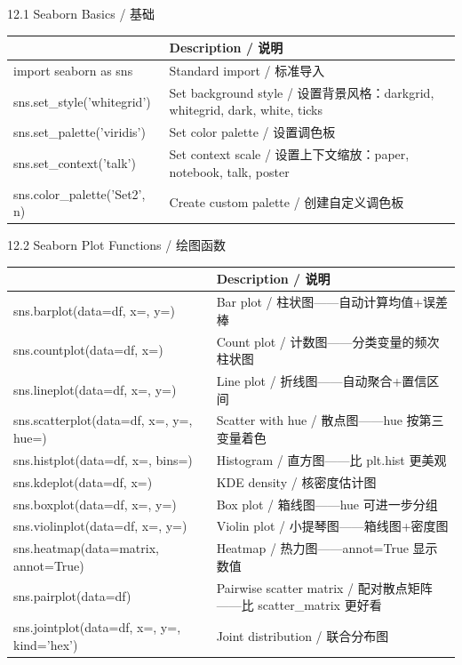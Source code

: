 \documentclass[11pt,a4paper]{report}
\begin{document}
\begin{cmdsection}{12.1  Seaborn Basics / 基础}
\normalsize\renewcommand{\arraystretch}{1.4}
\centering
\begin{tabularx}{\textwidth}{@{}>{\ttfamily}l>{\raggedright\arraybackslash}X@{}}
\toprule
\multicolumn{1}{@{}l}{\textbf{Syntax}} & \textbf{Description / 说明} \\ \midrule
import seaborn as sns        & Standard import / 标准导入 \\
sns.set\_style('whitegrid')  & Set background style / 设置背景风格：darkgrid, whitegrid, dark, white, ticks \\
sns.set\_palette('viridis')  & Set color palette / 设置调色板 \\
sns.set\_context('talk')     & Set context scale / 设置上下文缩放：paper, notebook, talk, poster \\
sns.color\_palette('Set2', n) & Create custom palette / 创建自定义调色板 \\
\bottomrule
\end{tabularx}
\end{cmdsection}

\begin{cmdsection}{12.2  Seaborn Plot Functions / 绘图函数}
\normalsize\renewcommand{\arraystretch}{1.4}
\centering
\begin{tabularx}{\textwidth}{@{}>{\ttfamily}l>{\raggedright\arraybackslash}X@{}}
\toprule
\multicolumn{1}{@{}l}{\textbf{Syntax}} & \textbf{Description / 说明} \\ \midrule
sns.barplot(data=df, x=, y=) & Bar plot / 柱状图——自动计算均值+误差棒 \\
sns.countplot(data=df, x=)   & Count plot / 计数图——分类变量的频次柱状图 \\
sns.lineplot(data=df, x=, y=) & Line plot / 折线图——自动聚合+置信区间 \\
sns.scatterplot(data=df, x=, y=, hue=) & Scatter with hue / 散点图——hue 按第三变量着色 \\
sns.histplot(data=df, x=, bins=) & Histogram / 直方图——比 plt.hist 更美观 \\
sns.kdeplot(data=df, x=)     & KDE density / 核密度估计图 \\
sns.boxplot(data=df, x=, y=) & Box plot / 箱线图——hue 可进一步分组 \\
sns.violinplot(data=df, x=, y=) & Violin plot / 小提琴图——箱线图+密度图 \\
sns.heatmap(data=matrix, annot=True) & Heatmap / 热力图——annot=True 显示数值 \\
sns.pairplot(data=df)        & Pairwise scatter matrix / 配对散点矩阵——比 scatter\_matrix 更好看 \\
sns.jointplot(data=df, x=, y=, kind='hex') & Joint distribution / 联合分布图 \\
\bottomrule
\end{tabularx}
\end{cmdsection}
\end{document}
